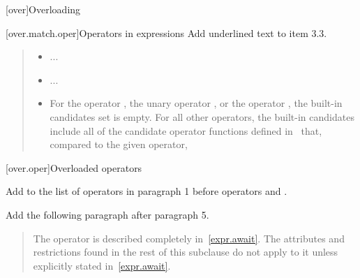 
\setcounter{chapter}{12}
[over]{Overloading}

\setcounter{section}{3}
\setcounter{subsection}{1}
\setcounter{subsubsection}{1}
[over.match.oper]{Operators in expressions}%
Add underlined text to item 3.3.

\begin{quote}
	\setcounter{Paras}{3}
	\begin{itemize}
		\item ...
		\item ...
		\item
For the operator
\tcode{,},
the unary operator
\tcode{\&},
\added{,}
or the operator
\tcode{->},
the built-in candidates set is empty.
For all other operators, the built-in candidates include all
of the candidate operator functions defined in~ that,
compared to the given operator,
	\end{itemize}
\end{quote}

\setcounter{section}{4}
[over.oper]{Overloaded operators}

Add  to the list of operators in paragraph 1 before operators \tcode{()} and \tcode{[]}.

Add the following paragraph after paragraph 5.

\begin{quote}
\setcounter{Paras}{5}
\pnum
The 
 operator
is described completely in~\ref{expr.await}.
The attributes and restrictions
found in the rest of this subclause do not apply to it unless explicitly
stated in~\ref{expr.await}.
\end{quote}

%
%
%
%

